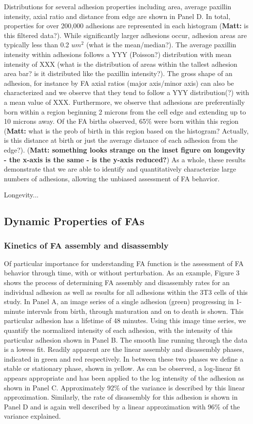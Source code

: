 \documentclass[10pt]{article}
\begin{document}
Distributions for several adhesion properties including area, average paxillin intensity, axial ratio and distance from edge are shown in Panel D. In total, properties for over 200,000 adhesions are represented in each histogram (\textbf{Matt:} is this filtered data?). While significantly larger adhesions occur, adhesion areas are typically less than 0.2 $um^2$ (what is the mean/median?). The average paxillin intensity within adhesions follows a YYY (Poisson?) distribution with mean intensity of XXX (what is the distribution of areas within the tallest adhesion area bar? is it distributed like the paxillin intensity?). The gross shape of an adhesion, for instance by FA axial ratios (major axis/minor axis) can also be characterized and we observe that they tend to follow a YYY distribution(?) with a mean value of XXX. Furthermore, we observe that adhesions are preferentially born within a region beginning 2 microns from the cell edge and extending up to 10 microns away. Of the FA births observed, 65\% were born within this region (\textbf{Matt:} what is the prob of birth in this region based on the histogram? Actually, is this distance at birth or just the average distance of each adhesion from the edge?). (\textbf{Matt: something looks strange on the inset figure on longevity - the x-axis is the same - is the y-axis reduced?}) As a whole, these results demonstrate that we are able to identify and quantitatively characterize large numbers of adhesions, allowing the unbiased assessment of FA behavior.

Longevity...

\subsection*{Dynamic Properties of FAs}
\subsubsection*{Kinetics of FA assembly and disassembly}
Of particular importance for understanding FA function is the assessment of FA behavior through time, with or without perturbation. As an example, Figure 3 shows the process of determining FA assembly and disassembly rates for an individual adhesion as well as results for all adhesions within the 3T3 cells of this study. In Panel A, an image series of a single adhesion (green) progressing in 1-minute intervals from birth, through maturation and on to death is shown. This particular adhesion has a lifetime of 48 minutes. Using this image time series, we quantify the normalized intensity of each adhesion, with the intensity of this particular adhesion shown in Panel B. The smooth line running through the data is a lowess fit. Readily apparent are the linear assembly and disassembly phases, indicated in green and red respectively. In between these two phases we define a stable or stationary phase, shown in yellow. As can be observed, a log-linear fit appears appropriate and has been applied to the log intensity of the adhesion as shown in Panel C. Approximately 92\% of the variance is described by this linear approximation. Similarly, the rate of disassembly for this adhesion is shown in Panel D and is again well described by a linear approximation with 96\% of the variance explained.
\end{document}
